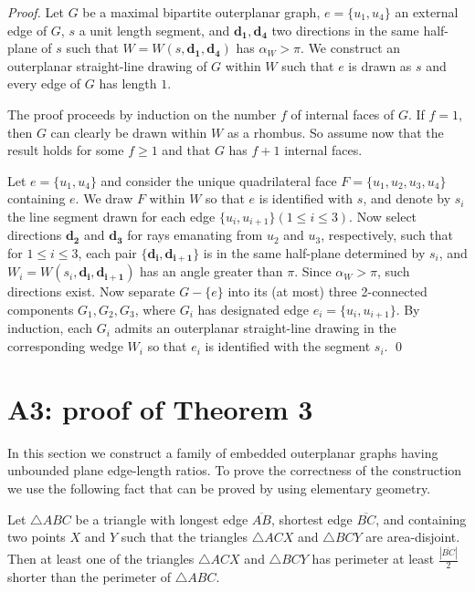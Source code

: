 \documentclass[orivec]{llncs}
\begin{document}
\begin{proof}Let $G$ be a maximal bipartite outerplanar graph, $e = \{u_1,u_4\}$ an external edge of $G$,
$s$ a unit length segment, and $\mathbf{d_1}, \mathbf{d_4}$ two directions
in the same half-plane of $s$ such that $W = W(s,\mathbf{d_1}, \mathbf{d_4})$ has $\alpha_W > \pi$.
We construct an outerplanar straight-line drawing of $G$ within $W$ such that
$e$ is drawn as $s$ and every edge of $G$ has length $1$.

The proof proceeds by induction on the number $f$ of internal faces of $G$.
If $f = 1$, then $G$ can clearly be drawn within $W$ as a rhombus.
So assume now that the result holds for some $f \geq 1$ and that $G$ has $f+1$ internal faces.

Let $e = \{u_1, u_4\}$ and consider the unique quadrilateral face $F = \{ u_1, u_2, u_3, u_4 \}$ containing $e$.
We draw $F$ within $W$ so that $e$ is identified with $s$, and denote by $s_i$ the line segment
drawn for each edge $\{u_i, u_{i+1}\} (1 \leq i \leq 3)$.
Now select directions $\mathbf{d_2}$ and
$\mathbf{d_3}$ for rays emanating from $u_2$ and $u_3$, respectively, such that for $1 \leq i \leq 3$,
each pair $\{\mathbf{d_i}, \mathbf{d_{i+1}}\}$ is in the same half-plane determined by $s_i$, and
$W_i = W(s_i,\mathbf{d_i}, \mathbf{d_{i+1}})$
has an angle greater than $\pi$. Since $\alpha_W > \pi$, such directions exist.
Now separate $G-\{e\}$ into its (at most) three 2-connected components $G_1, G_2, G_3$, where $G_i$ has designated edge $e_i = \{u_i, u_{i+1}\}$.
By induction, each $G_i$ admits an outerplanar straight-line drawing in the corresponding wedge $W_i$ so that $e_i$ is identified with the segment $s_i$. \qed
\end{proof}

\section*{A3: proof of Theorem 3}

In this section we construct a family of embedded outerplanar graphs having unbounded plane edge-length ratios. To prove the correctness of the construction we use the following fact that can be proved by using elementary geometry.

\begin{lemma}\label{le:shrinking-perimeter}
Let $\triangle ABC$ be a triangle with longest edge $\overline{AB}$,
shortest edge $\overline{BC}$, and containing two points $X$ and $Y$
such that the triangles $\triangle ACX$ and $\triangle BCY$ are area-disjoint.
Then at least one of the triangles $\triangle ACX$ and $\triangle BCY$ has perimeter at
least $\frac{| \overline{BC} |}{2}$ shorter than the perimeter of $\triangle ABC$.
\end{lemma}
\end{document}
